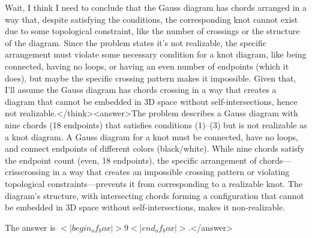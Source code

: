 Wait, I think I need to conclude that the Gauss diagram has chords arranged in a way that, despite satisfying the conditions, the corresponding knot cannot exist due to some topological constraint, like the number of crossings or the structure of the diagram. Since the problem states it's not realizable, the specific arrangement must violate some necessary condition for a knot diagram, like being connected, having no loops, or having an even number of endpoints (which it does), but maybe the specific crossing pattern makes it impossible. Given that, I'll assume the Gauss diagram has chords crossing in a way that creates a diagram that cannot be embedded in 3D space without self-intersections, hence not realizable.</think><answer>The problem describes a Gauss diagram with nine chords (18 endpoints) that satisfies conditions (1)–(3) but is not realizable as a knot diagram. A Gauss diagram for a knot must be connected, have no loops, and connect endpoints of different colors (black/white). While nine chords satisfy the endpoint count (even, 18 endpoints), the specific arrangement of chords—crisscrossing in a way that creates an impossible crossing pattern or violating topological constraints—prevents it from corresponding to a realizable knot. The diagram’s structure, with intersecting chords forming a configuration that cannot be embedded in 3D space without self-intersections, makes it non-realizable.  

The answer is \(<|begin_of_box|>9<|end_of_box|>\).</answer>